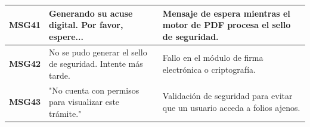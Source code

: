 \begin{longtable}{|p{2cm}|p{6cm}|p{6cm}|}
    \hypertarget{msg:MSG41}{\textbf{MSG41}} & Generando su acuse digital. Por favor, espere... & Mensaje de espera mientras el motor de PDF procesa el sello de seguridad. \\ \hline
    \hypertarget{msg:MSG42}{\textbf{MSG42}} & No se pudo generar el sello de seguridad. Intente más tarde. & Fallo en el módulo de firma electrónica o criptografía. \\ \hline
    \hypertarget{msg:MSG43}{\textbf{MSG43}} & "No cuenta con permisos para visualizar este trámite." & Validación de seguridad para evitar que un usuario acceda a folios ajenos. \\ \hline




\end{longtable}